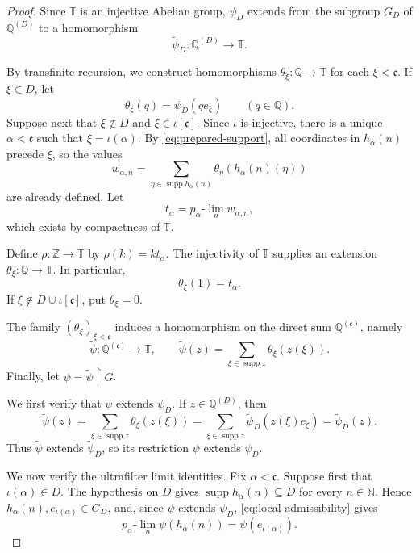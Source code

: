 \documentclass[11pt]{amsart}
\theoremstyle{definition}
\newcommand{\T}{\mathbb T}
\newcommand{\N}{\mathbb N}
\newcommand{\Z}{\mathbb Z}
\newcommand{\Q}{\mathbb Q}
\newcommand{\cfrak}{\mathfrak c}
\newcommand{\supp}{\operatorname{supp}}
\begin{document}
\begin{proof}
Since $\T$ is an injective Abelian group, $\psi_D$ extends from the subgroup
$G_D$ of $\Q^{(D)}$ to a homomorphism
\[
 \widetilde\psi_D:\Q^{(D)}\longrightarrow\T.
\]

By transfinite recursion, we construct homomorphisms
$\theta_\xi:\Q\to\T$ for each $\xi<\cfrak$.
If $\xi\in D$, let
\[
 \theta_\xi(q)=\widetilde\psi_D(qe_\xi)
 \qquad(q\in\Q).
\]
Suppose next that $\xi\notin D$ and $\xi\in\iota[\cfrak]$.
Since $\iota$ is injective, there is a unique $\alpha<\cfrak$ such that
$\xi=\iota(\alpha)$.  By \eqref{eq:prepared-support}, all coordinates in
$h_\alpha(n)$ precede $\xi$, so the values
\begin{equation}\label{eq:stage-evaluation}
 w_{\alpha,n}=
 \sum_{\eta\in\supp h_\alpha(n)}
 \theta_\eta(h_\alpha(n)(\eta))
\end{equation}
are already defined.  Let
\begin{equation}\label{eq:compact-stage-limit}
 t_\alpha=p_\alpha\text{-}\lim_n w_{\alpha,n},
\end{equation}
which exists by compactness of $\T$.

Define $\rho:\Z\to\T$ by $\rho(k)=kt_\alpha$.  The injectivity of $\T$
supplies an extension $\theta_\xi:\Q\to\T$.  In particular,
\begin{equation}\label{eq:coordinate-one}
 \theta_\xi(1)=t_\alpha.
\end{equation}
If $\xi\notin D\cup\iota[\cfrak]$, put $\theta_\xi=0$.

The family $(\theta_\xi)_{\xi<\cfrak}$ induces a homomorphism on the
direct sum $\Q^{(\cfrak)}$, namely
\begin{equation}\label{eq:global-homomorphism}
 \widetilde\psi:\Q^{(\cfrak)}\longrightarrow\T,
 \qquad
 \widetilde\psi(z)=
 \sum_{\xi\in\supp z}\theta_\xi(z(\xi)).
\end{equation}
Finally, let $\psi=\widetilde\psi\mathbin{\upharpoonright}G$.

We first verify that $\psi$ extends $\psi_D$.  If $z\in\Q^{(D)}$, then
\[
 \widetilde\psi(z)
 =\sum_{\xi\in\supp z}\theta_\xi(z(\xi))
 =\sum_{\xi\in\supp z}\widetilde\psi_D(z(\xi)e_\xi)
 =\widetilde\psi_D(z).
\]
Thus $\widetilde\psi$ extends $\widetilde\psi_D$, so its restriction $\psi$
extends $\psi_D$.

We now verify the ultrafilter limit identities.  Fix $\alpha<\cfrak$.
Suppose first that $\iota(\alpha)\in D$.  The hypothesis on $D$ gives
$\supp h_\alpha(n)\subseteq D$ for every $n\in\N$.  Hence
$h_\alpha(n),e_{\iota(\alpha)}\in G_D$, and, since $\psi$ extends $\psi_D$,
\eqref{eq:local-admissibility} gives
\[
 p_\alpha\text{-}\lim_n\psi(h_\alpha(n))
 =\psi(e_{\iota(\alpha)}).
\]


\end{proof}
\end{document}
